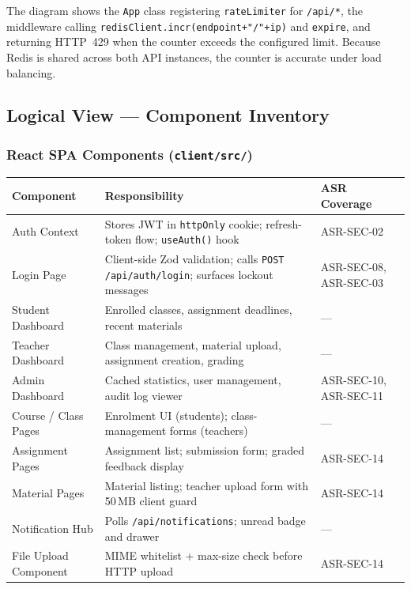\documentclass[12pt,a4paper]{article}
\begin{document}
The diagram shows the \texttt{App} class registering \texttt{rateLimiter} for
\texttt{/api/*}, the middleware calling \texttt{redisClient.incr(endpoint+"/"+ip)} and
\texttt{expire}, and returning HTTP~429 when the counter exceeds the configured limit.
Because Redis is shared across both API instances, the counter is accurate under load
balancing.

\subsection{Logical View --- Component Inventory}

\subsubsection{React SPA Components (\texttt{client/src/})}

\begin{tabularx}{\textwidth}{L{3.5cm} L{6.5cm} L{3.5cm}}
  \toprule
  \textbf{Component} & \textbf{Responsibility} & \textbf{ASR Coverage} \\
  \midrule
  Auth Context & Stores JWT in \texttt{httpOnly} cookie; refresh-token flow; \texttt{useAuth()} hook & ASR-SEC-02 \\
  Login Page & Client-side Zod validation; calls \texttt{POST /api/auth/login}; surfaces lockout messages & ASR-SEC-08, ASR-SEC-03 \\
  Student Dashboard & Enrolled classes, assignment deadlines, recent materials & --- \\
  Teacher Dashboard & Class management, material upload, assignment creation, grading & --- \\
  Admin Dashboard & Cached statistics, user management, audit log viewer & ASR-SEC-10, ASR-SEC-11 \\
  Course / Class Pages & Enrolment UI (students); class-management forms (teachers) & --- \\
  Assignment Pages & Assignment list; submission form; graded feedback display & ASR-SEC-14 \\
  Material Pages & Material listing; teacher upload form with 50\,MB client guard & ASR-SEC-14 \\
  Notification Hub & Polls \texttt{/api/notifications}; unread badge and drawer & --- \\
  File Upload Component & MIME whitelist + max-size check before HTTP upload & ASR-SEC-14 \\
  \bottomrule
\end{tabularx}
\end{document}
